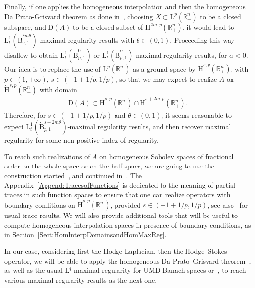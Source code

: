 \documentclass[AHL,Unicode,longabstracts,published]{cedram}
\newcommand{\bbR}{\mathbb{R}}
\newcommand{\rmH}{\mathrm{H}}%
\newcommand{\rmB}{\mathrm{B}}
\newcommand{\rmD}{\mathrm{D}}
\newcommand{\rmL}{\mathrm{L}}
\begin{document}
Finally, if one applies the homogeneous interpolation and then the homogeneous Da Prato-Grisvard theorem as done in~\cite[Chapters~2,~3~\&~4]{DanchinHieberMuchaTolk2020}, choosing $X\subset \rmL^p(\bbR^n_+)$ to be a closed subspace, and $\rmD(A)$ to be a closed subset of $\rmH^{2m,p}(\bbR^n_+)$, it would lead to $\rmL^1_t(\dot{\rmB}^{2m\theta}_{p,1})$-maximal regularity results with $\theta \in(0,1)$. Proceeding this way disallow to obtain $\rmL^1_t(\dot{\rmB}^{0}_{p,1})$ or $\rmL^1_t(\dot{\rmB}^{\alpha}_{p,1})$-maximal regularity results, for $\alpha<0$. Our idea is to replace the use of $\rmL^p(\bbR^n_+)$ as a ground space by $\dot{\rmH}^{s,p}(\bbR^n_+)$, with $p\in(1,+\infty)$, $s\in(-1+1/p,1/p)$, so that we may expect to realize $A$ on $\dot{\rmH}^{s,p}(\bbR^n_+)$ with domain
\begin{align*}
\rmD(A) \subset \dot{\rmH}^{s,p}\left(\bbR^n_+\right)\cap \dot{\rmH}^{s+2m,p}\left(\bbR^n_+\right).
\end{align*}
Therefore, for $s\in(-1+1/p,1/p)$ and $\theta\in(0,1)$, it seems reasonable to expect $\rmL^1_t(\dot{\rmB}^{s+2m\theta}_{p,1})$-maximal regularity results, and then recover maximal regularity for some non-positive index of regularity.

To reach such realizations of $A$ on homogeneous Sobolev spaces of fractional order on the whole space or on the half-space, we are going to use the construction started~\cite[Chapter~3]{DanchinHieberMuchaTolk2020}, and continued in~\cite[Sections~2~\&~3]{Gaudin2022}. The Appendix~\ref{Append:TracesofFunctions} is dedicated to the meaning of partial traces in such function spaces to ensure that one can realize operators with boundary conditions on $\dot{\rmH}^{s,p}(\bbR^n_+)$, provided $s\in(-1+1/p,1/p)$, see also~\cite[Section~4]{Gaudin2022} for usual trace results. We will also provide additional tools that will be useful to compute homogeneous interpolation spaces in presence of boundary conditions, as in Section~\ref{Sect:HomInterpDomainsandHomMaxReg}.


In our case, considering first the Hodge Laplacian, then the Hodge--Stokes operator, we will be able to apply the homogeneous Da Prato--Grisvard theorem~\cite[Theorem~2.20]{DanchinHieberMuchaTolk2020}, as well as the usual $\rmL^q$-maximal regularity for UMD Banach spaces or~\cite[Theorem~4.7]{Gaudin2023}, to reach various maximal regularity results as the next one.
\end{document}
